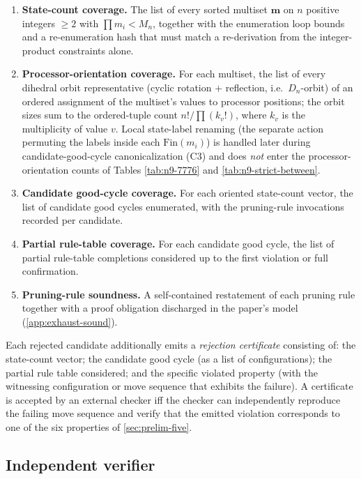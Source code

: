 \documentclass[11pt,a4paper]{article}
\theoremstyle{plain}
\theoremstyle{definition}
\newcommand{\Mn}{M_n}
\begin{document}
\begin{enumerate}[leftmargin=*,label=(C\arabic*)]
\item \textbf{State-count coverage.}  The list of every sorted multiset
$\mathbf{m}$ on $n$ positive integers $\ge 2$ with $\prod m_i < \Mn$,
together with the enumeration loop bounds and a re-enumeration hash
that must match a re-derivation from the integer-product constraints
alone.
\item \textbf{Processor-orientation coverage.}  For each multiset,
the list of every dihedral orbit representative (cyclic rotation $+$
reflection, i.e.\ $D_n$-orbit) of an ordered assignment of the
multiset's values to processor positions; the orbit sizes sum to the
ordered-tuple count $n! / \prod (k_v!)$, where $k_v$ is the
multiplicity of value $v$.  Local state-label renaming (the separate
action permuting the labels inside each $\mathrm{Fin}(m_i)$) is
handled later during candidate-good-cycle canonicalization (C3) and
does \emph{not} enter the processor-orientation counts of Tables
\ref{tab:n9-7776} and \ref{tab:n9-strict-between}.
\item \textbf{Candidate good-cycle coverage.}  For each oriented
state-count vector, the list of candidate good cycles enumerated, with
the pruning-rule invocations recorded per candidate.
\item \textbf{Partial rule-table coverage.}  For each candidate good
cycle, the list of partial rule-table completions considered up to the
first violation or full confirmation.
\item \textbf{Pruning-rule soundness.}  A self-contained restatement of
each pruning rule together with a proof obligation discharged in the
paper's model (\cref{app:exhaust-sound}).
\end{enumerate}

Each rejected candidate additionally emits a \emph{rejection
certificate} consisting of: the state-count vector; the candidate good
cycle (as a list of configurations); the partial rule table
considered; and the specific violated property (with the witnessing
configuration or move sequence that exhibits the failure).  A
certificate is accepted by an external checker iff the checker can
independently reproduce the failing move sequence and verify that the
emitted violation corresponds to one of the six properties of
\cref{sec:prelim-five}.

\subsection{Independent verifier}\label{app:exhaust-independent}
\end{document}
